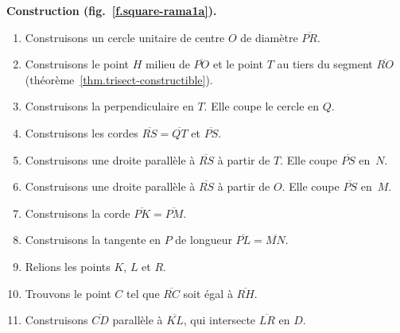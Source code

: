 \textbf{Construction (fig.~\ref{f.square-rama1a}).}
\begin{enumerate}

\item Construisons un cercle unitaire de centre $O$ de diamètre  $\overline{PR}$.

\item Construisons le point $H$ milieu de  $\overline{PO}$ et le point $T$ au tiers du segment $\overline{RO}$  (théorème~\ref{thm.trisect-constructible}).

\item Construisons la perpendiculaire en $T$. Elle coupe le cercle en $Q$.

\item Construisons les cordes $\overline{RS}=\overline{QT}$ et  $\overline{PS}$.

\item Construisons une droite parallèle à $\overline{RS}$ à partir de $T$. Elle coupe $\overline{PS}$ en~$N$.

\item Construisons une droite parallèle à $\overline{RS}$ à partir de $O$. Elle  coupe $\overline{PS}$ en~$M$.

\item Construisons la corde $\overline{PK}=\overline{PM}$.

\item Construisons la tangente en $P$ de longueur $\overline{PL}=\overline{MN}$.

\item Relions les points $K$, $L$ et $R$.

\item Trouvons le point $C$ tel que $\overline{RC}$ soit égal à $\overline{RH}$.

\item Construisons $\overline{CD}$ parallèle à $\overline{KL}$, qui intersecte $\overline{LR}$ en $D$. 
\end{enumerate}

